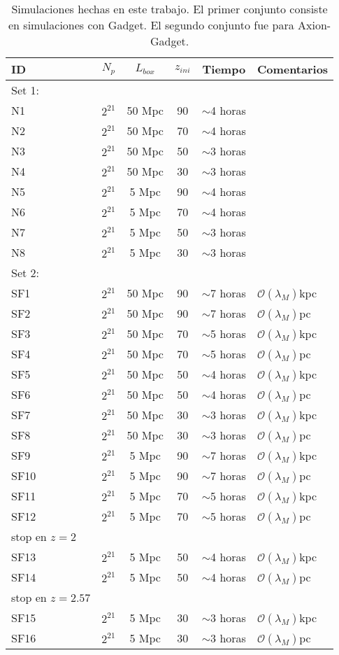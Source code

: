 \documentclass[a4paper,openright,10pt, oneside, final]{book}
\begin{document}
\begin{table}[]
\caption{Simulaciones hechas en este trabajo. El primer conjunto consiste en simulaciones con Gadget. El segundo conjunto fue para Axion-Gadget.}
\label{Tabla 4.3}\centering%
\begin{tabularx}{0.9\textwidth}{@{\extracolsep{\fill}}  l c c c c l }
\toprule%
ID&$N_{p}$&$L_{box}$&$z_{ini}$&Tiempo&Comentarios\\\toprule%
Set 1:\\
N1&$2^{21}$&50 Mpc&90&$\sim$4 horas&\\
N2&$2^{21}$&50 Mpc&70&$\sim$4 horas\\
N3&$2^{21}$&50 Mpc&50&$\sim$3 horas\\
N4&$2^{21}$&50 Mpc&30&$\sim$3 horas\\
N5&$2^{21}$&5 Mpc&90&$\sim$4 horas\\
N6&$2^{21}$&5 Mpc&70&$\sim$4 horas\\
N7&$2^{21}$&5 Mpc&50&$\sim$3 horas\\
N8&$2^{21}$&5 Mpc&30&$\sim$3 horas\\\midrule
Set 2:\\
SF1&$2^{21}$&50 Mpc&90&$\sim$7 horas&$\mathcal{O}(\lambda_{M})$kpc\\
SF2&$2^{21}$&50 Mpc&90&$\sim$7 horas&$\mathcal{O}(\lambda_{M})$pc\\
SF3&$2^{21}$&50 Mpc&70&$\sim$5 horas&$\mathcal{O}(\lambda_{M})$kpc\\
SF4&$2^{21}$&50 Mpc&70&$\sim$5 horas&$\mathcal{O}(\lambda_{M})$pc\\
SF5&$2^{21}$&50 Mpc&50&$\sim$4 horas&$\mathcal{O}(\lambda_{M})$kpc\\
SF6&$2^{21}$&50 Mpc&50&$\sim$4 horas&$\mathcal{O}(\lambda_{M})$pc\\
SF7&$2^{21}$&50 Mpc&30&$\sim$3 horas&$\mathcal{O}(\lambda_{M})$kpc\\
SF8&$2^{21}$&50 Mpc&30&$\sim$3 horas&$\mathcal{O}(\lambda_{M})$pc\\
SF9&$2^{21}$&5 Mpc&90&$\sim$7 horas&$\mathcal{O}(\lambda_{M})$kpc\\
SF10&$2^{21}$&5 Mpc&90&$\sim$7 horas&$\mathcal{O}(\lambda_{M})$pc\\
SF11&$2^{21}$&5 Mpc&70&$\sim$5 horas&$\mathcal{O}(\lambda_{M})$kpc\\\midrule
SF12&$2^{21}$&5 Mpc&70&$\sim$5 horas&$\mathcal{O}(\lambda_{M})$pc\\stop en $z = 2$\\\midrule
SF13&$2^{21}$&5 Mpc&50&$\sim$4 horas&$\mathcal{O}(\lambda_{M})$kpc\\\midrule
SF14&$2^{21}$&5 Mpc&50&$\sim$4 horas&$\mathcal{O}(\lambda_{M})$pc\\stop en $z = 2.57$\\\midrule
SF15&$2^{21}$&5 Mpc&30&$\sim$3 horas&$\mathcal{O}(\lambda_{M})$kpc\\
SF16&$2^{21}$&5 Mpc&30&$\sim$3 horas&$\mathcal{O}(\lambda_{M})$pc\\\bottomrule









\end{tabularx}
\end{table}
\end{document}
